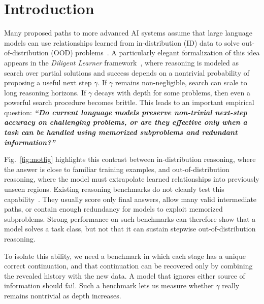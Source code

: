 \documentclass{article}
\begin{document}
\begin{abstract}
\end{abstract}


\section{Introduction}

Many proposed paths to more advanced AI systems assume that large language models can use relationships learned from in-distribution (ID) data to solve out-of-distribution (OOD) problems~\citep{wei2022cot,wang2022selfconsistency,pmlr-v202-fu23d,10.5555/3600270.3601883,shao2024deepseekmathpushinglimitsmathematical}. A particularly elegant formalization of this idea appears in the \emph{Diligent Learner} framework~\citep{shalev2025diligent}, where reasoning is modeled as search over partial solutions and success depends on a nontrivial probability of proposing a useful next step $\gamma$. If $\gamma$ remains non-negligible, search can scale to long reasoning horizons. If $\gamma$ decays with depth for some problems, then even a powerful search procedure becomes brittle. This leads to an important empirical question: \textbf{\textit{``Do current language models preserve non-trivial next-step accuracy on challenging problems, or are they effective only when a task can be handled using memorized subproblems and redundant information?''}} 


Fig.~\ref{fig:motfig} highlights this contrast between in-distribution reasoning, where the answer is close to familiar training examples, and out-of-distribution reasoning, where the model must extrapolate learned relationships into previously unseen regions. Existing reasoning benchmarks do not cleanly test this capability~\citep{cobbe2021trainingverifierssolvemath,hendrycks2021measuring,jimenez2024swebench}. They usually score only final answers, allow many valid intermediate paths, or contain enough redundancy for models to exploit memorized subproblems. Strong performance on such benchmarks can therefore show that a model solves a task class, but not that it can sustain stepwise out-of-distribution reasoning.

To isolate this ability, we need a benchmark in which each stage has a unique correct continuation, and that continuation can be recovered only by combining the revealed history with the new data. A model that ignores either source of information should fail. Such a benchmark lets us measure whether $\gamma$ really remains nontrivial as depth increases.
\end{document}
